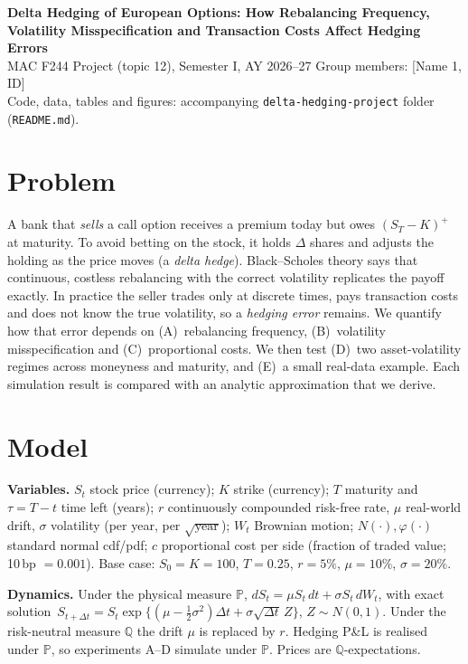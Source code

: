 \documentclass[10pt,a4paper]{article}
\begin{document}
\begin{center}
{\Large\bfseries Delta Hedging of European Options: How Rebalancing Frequency,\\[1pt]
Volatility Misspecification and Transaction Costs Affect Hedging Errors}\\[3pt]
{\small MAC F244 Project (topic 12), Semester I, AY 2026--27 \quad Group members:
[Name 1, ID] \;[Name 2, ID] \;[Name 3, ID] \;[Name 4, ID] \;[Name 5, ID]}\\
{\small Code, data, tables and figures: accompanying \texttt{delta-hedging-project} folder (\texttt{README.md}).}
\end{center}

\section{Problem}
A bank that \emph{sells} a call option receives a premium today but owes $(S_T-K)^+$ at maturity. To avoid
betting on the stock, it holds $\Delta$ shares and adjusts the holding as the price moves (a \emph{delta hedge}).
Black--Scholes theory says that continuous, costless rebalancing with the correct volatility replicates the
payoff exactly. In practice the seller trades only at discrete times, pays transaction costs and does not know
the true volatility, so a \emph{hedging error} remains. We quantify how that error depends on (A)~rebalancing
frequency, (B)~volatility misspecification and (C)~proportional costs. We then test (D)~two asset-volatility regimes across moneyness and
maturity, and (E)~a small real-data example. Each simulation result is compared with an analytic
approximation that we derive.

\section{Model}
\textbf{Variables.} $S_t$ stock price (currency); $K$ strike (currency); $T$ maturity and $\tau=T-t$ time left (years);
$r$ continuously compounded risk-free rate, $\mu$ real-world drift, $\sigma$ volatility (per year, per $\sqrt{\text{year}}$);
$W_t$ Brownian motion; $N(\cdot),\varphi(\cdot)$ standard normal cdf/pdf; $c$ proportional cost per side
(fraction of traded value; 10\,bp $=0.001$). Base case: $S_0=K=100$, $T=0.25$, $r=5\%$, $\mu=10\%$, $\sigma=20\%$.

\textbf{Dynamics.} Under the physical measure $\mathbb P$, $dS_t=\mu S_t\,dt+\sigma S_t\,dW_t$, with exact solution\,\cite{glass}
$S_{t+\Delta t}=S_t\exp\{(\mu-\tfrac12\sigma^2)\Delta t+\sigma\sqrt{\Delta t}\,Z\}$, $Z\sim N(0,1)$. Under the risk-neutral
measure $\mathbb Q$ the drift $\mu$ is replaced by $r$. Hedging P\&L is realised under $\mathbb P$, so experiments A--D simulate under $\mathbb P$. Prices are $\mathbb Q$-expectations.
\end{document}
